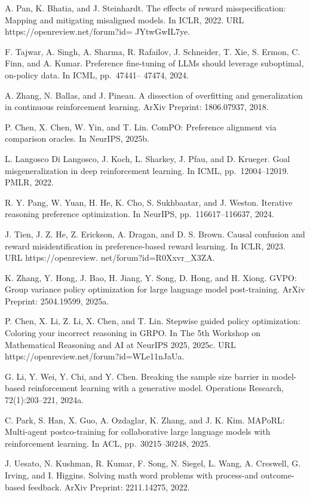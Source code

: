 \documentclass[
  10
]{article}
\begin{document}
A. Pan, K. Bhatia, and J. Steinhardt. The effects of reward
misspecification: Mapping and mitigating misaligned models. In ICLR,
2022. URL https://openreview.net/forum?id= JYtwGwIL7ye.

F. Tajwar, A. Singh, A. Sharma, R. Rafailov, J. Schneider, T. Xie, S.
Ermon, C. Finn, and A. Kumar. Preference fine-tuning of LLMs should
leverage suboptimal, on-policy data. In ICML, pp.~47441-- 47474, 2024.

A. Zhang, N. Ballas, and J. Pineau. A dissection of overfitting and
generalization in continuous reinforcement learning. ArXiv Preprint:
1806.07937, 2018.

P. Chen, X. Chen, W. Yin, and T. Lin. ComPO: Preference alignment via
comparison oracles. In NeurIPS, 2025b.

L. Langosco Di Langosco, J. Koch, L. Sharkey, J. Pfau, and D. Krueger.
Goal misgeneralization in deep reinforcement learning. In ICML,
pp.~12004--12019. PMLR, 2022.

R. Y. Pang, W. Yuan, H. He, K. Cho, S. Sukhbaatar, and J. Weston.
Iterative reasoning preference optimization. In NeurIPS,
pp.~116617--116637, 2024.

J. Tien, J. Z. He, Z. Erickson, A. Dragan, and D. S. Brown. Causal
confusion and reward misidentification in preference-based reward
learning. In ICLR, 2023. URL https://openreview.
net/forum?id=R0Xxvr\_X3ZA.

K. Zhang, Y. Hong, J. Bao, H. Jiang, Y. Song, D. Hong, and H. Xiong.
GVPO: Group variance policy optimization for large language model
post-training. ArXiv Preprint: 2504.19599, 2025a.

P. Chen, X. Li, Z. Li, X. Chen, and T. Lin. Stepwise guided policy
optimization: Coloring your incorrect reasoning in GRPO. In The 5th
Workshop on Mathematical Reasoning and AI at NeurIPS 2025, 2025c. URL
https://openreview.net/forum?id=WLe11nJaUa.

G. Li, Y. Wei, Y. Chi, and Y. Chen. Breaking the sample size barrier in
model-based reinforcement learning with a generative model. Operations
Research, 72(1):203--221, 2024a.

C. Park, S. Han, X. Guo, A. Ozdaglar, K. Zhang, and J. K. Kim. MAPoRL:
Multi-agent postco-training for collaborative large language models with
reinforcement learning. In ACL, pp.~30215--30248, 2025.

J. Uesato, N. Kushman, R. Kumar, F. Song, N. Siegel, L. Wang, A.
Creswell, G. Irving, and I. Higgins. Solving math word problems with
process-and outcome-based feedback. ArXiv Preprint: 2211.14275, 2022.
\end{document}
